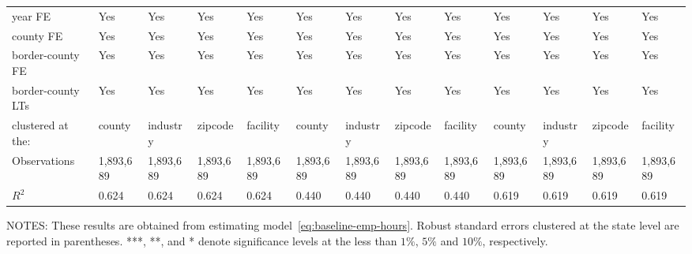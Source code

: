 \begin{table}[H]
{\begin{tabular}{@{}lllllllllllll@{}}
            year FE           & Yes       & Yes       & Yes       & Yes       & Yes       & Yes       & Yes       & Yes       & Yes       & Yes       & Yes       & Yes       \\
            county FE         & Yes       & Yes       & Yes       & Yes       & Yes       & Yes       & Yes       & Yes       & Yes       & Yes       & Yes       & Yes       \\
            border-county FE  & Yes       & Yes       & Yes       & Yes       & Yes       & Yes       & Yes       & Yes       & Yes       & Yes       & Yes       & Yes       \\
            border-county LTs & Yes       & Yes       & Yes       & Yes       & Yes       & Yes       & Yes       & Yes       & Yes       & Yes       & Yes       & Yes       \\\midrule
            clustered at the: & county    & industry  & zipcode   & facility  & county    & industry  & zipcode   & facility  & county    & industry  & zipcode   & facility  \\
            Observations      & 1,893,689 & 1,893,689 & 1,893,689 & 1,893,689 & 1,893,689 & 1,893,689 & 1,893,689 & 1,893,689 & 1,893,689 & 1,893,689 & 1,893,689 & 1,893,689 \\
            $R^2$             & 0.624     & 0.624     & 0.624     & 0.624     & 0.440     & 0.440     & 0.440     & 0.440     & 0.619     & 0.619     & 0.619     & 0.619     \\ \bottomrule \bottomrule
        \end{tabular}%
    }
    \begin{minipage}{\columnwidth}
        \vspace{0.05in}
        \tiny NOTES: These results are obtained from estimating model~\ref{eq:baseline-emp-hours}. Robust standard errors clustered at the state level are reported in parentheses. ***, **, and * denote significance levels at the less than $1\%$, $5\%$ and $10\%$, respectively.
    \end{minipage}
\end{table}